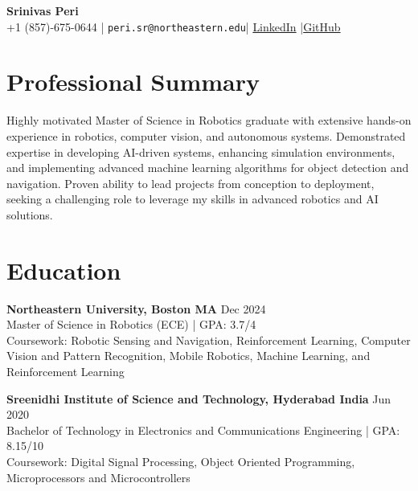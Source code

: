 \documentclass[a4paper,10pt]{article}
\begin{document}
\begin{center}
    {\LARGE \bfseries Srinivas Peri}\\
    +1 (857)-675-0644 | \texttt{peri.sr@northeastern.edu}|
    \href{https://www.linkedin.com/in/srinivas-peri-yob1998}{LinkedIn} |\href{https://github.com/MAHASHANA/}{GitHub}
\end{center}

\vspace{0.5ex}

\section*{Professional Summary}
Highly motivated Master of Science in Robotics graduate with extensive hands-on experience in robotics, computer vision, and autonomous systems. Demonstrated expertise in developing AI-driven systems, enhancing simulation environments, and implementing advanced machine learning algorithms for object detection and navigation. Proven ability to lead projects from conception to deployment, seeking a challenging role to leverage my skills in advanced robotics and AI solutions.

\section*{Education}
\noindent\textbf{Northeastern University, Boston MA} \hfill Dec 2024 \\
Master of Science in Robotics (ECE) | GPA: 3.7/4 \\
Coursework: Robotic Sensing and Navigation, Reinforcement Learning, Computer Vision and Pattern Recognition, Mobile Robotics, Machine Learning, and Reinforcement Learning

\noindent\textbf{Sreenidhi Institute of Science and Technology, Hyderabad India} \hfill Jun 2020 \\
Bachelor of Technology in Electronics and Communications Engineering | GPA: 8.15/10 \\
Coursework: Digital Signal Processing, Object Oriented Programming, Microprocessors and Microcontrollers
\end{document}
